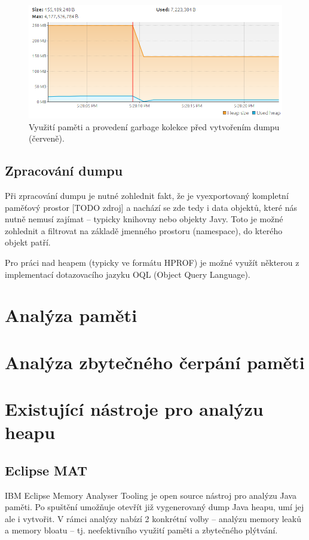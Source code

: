 \begin{figure}[h]
	\centering
	\includegraphics[scale=0.5]{obrazky/heapdump-performed.png}
	\caption{Využití paměti a provedení garbage kolekce před vytvořením dumpu (červeně).}
	\label{obr1}
\end{figure}

\section{Zpracování dumpu}
Při zpracování dumpu je nutné zohlednit fakt, že je vyexportovaný kompletní paměťový prostor [TODO zdroj] a nachází se zde tedy i data objektů, které nás nutně nemusí zajímat – typicky knihovny nebo objekty Javy. Toto je možné zohlednit a filtrovat na základě jmenného prostoru (namespace), do kterého objekt patří.

Pro práci nad heapem  (typicky ve formátu HPROF) je možné využít některou z implementací dotazovacího jazyku OQL (Object Query Language).

\chapter{Analýza paměti}

\chapter{Analýza zbytečného čerpání paměti}

\chapter{Existující nástroje pro analýzu heapu}

\section{Eclipse MAT}
IBM Eclipse Memory Analyser Tooling je open source nástroj pro analýzu Java paměti. Po spuštění umožňuje otevřít již vygenerovaný dump Java heapu, umí jej ale i vytvořit. V rámci analýzy nabízí 2 konkrétní volby – analýzu memory leaků a memory bloatu – tj. neefektivního využití paměti a zbytečného plýtvání. 

